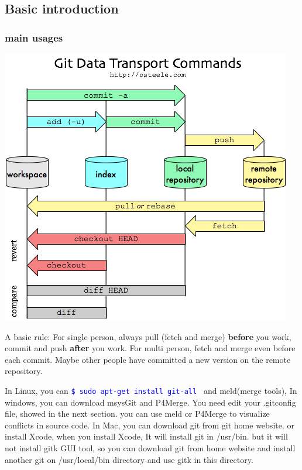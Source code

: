 \documentclass[paper=8.5in:11in, twoside, 12pt, pagesize=pdftex]{book}
\newcommand{\linuxcommand}[1]{\texttt{\textcolor{blue}{\$ #1 \Pisymbol{psy}{191}}}}
\begin{document}
\subsection{Basic introduction}
\subsubsection{main usages}

	\begin{center}
		\includegraphics[scale=0.5]{pics/git-transport} 
	\end{center}

	A basic rule:  For single person, always pull (fetch and merge) \textbf{before} you work,  commit and push \textbf{after} you work.  For multi person, fetch and merge even before each commit.  Maybe other people have committed a new version on the remote repository. 
	
	In Linux, you can \linuxcommand{sudo apt-get install git-all} and meld(merge tools), In windows, you can download msysGit and P4Merge. You need edit your .gitconfig file, showed in the next section. you can use meld or P4Merge to visualize conflicts in source code. In Mac, you can download git from git home website. or install Xcode, when you install Xcode, It will install git in /usr/bin. but it will not install gitk GUI tool, so you can download git from home website and install another git on /usr/local/bin directory and use gitk in this directory. 
	
\end{document}

